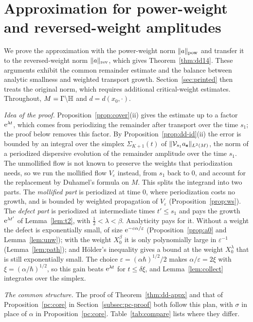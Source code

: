 \section{Approximation for power-weight and reversed-weight amplitudes}\label{sec:companion}

We prove the approximation with the power-weight norm $\lVert a\rVert_{\mathrm{pow}}$ and transfer it to the reversed-weight norm $\lVert a\rVert_{\mathrm{rev}}$, which gives Theorem~\ref{thm:dd14}. These arguments exhibit the common remainder estimate and the balance between analytic smallness and weighted transport growth. Section~\ref{sec:printed} then treats the original norm, which requires additional critical-weight estimates.
Throughout, $M=\Gamma\backslash\mathbb{H}$ and $d=d(x_0,\cdot)$.

\medskip\noindent\emph{Idea of the proof.}
Proposition~\ref{prop:cover}(ii) gives the estimate up to a factor $\mathrm{e}^{\lambda t}$, which comes from periodizing the remainder after
transport over the time $s_1$; the proof below removes this factor.
By Proposition~\ref{prop:dd-id}(ii) the error is bounded by an integral over the simplex $\Sigma_{K+1}(t)$ of
$\lVert \mathcal V_{s_1}a_{\mathbf s}\rVert_{L^2(M)}$, the norm of a periodized dispersive evolution of the remainder amplitude over the time
$s_1$. The unmollified flow is not known to preserve the weights that periodization needs, so we run the mollified flow
$V_\varepsilon$ instead, from $s_1$ back to $0$, and account for the replacement by Duhamel's formula on $M$. This splits the integrand
into two parts. The \emph{mollified part} is periodized at time $0$, where periodization costs no growth, and is bounded by weighted
propagation of $V_\varepsilon$ (Proposition~\ref{prop:ws}). The \emph{defect part} is periodized at intermediate times $t'\le s_1$ and pays
the growth $\mathrm{e}^{\lambda t'}$ of Lemma~\ref{lem:t2}, with $\tfrac12<\lambda<\beta$. Analyticity pays for it. Without a weight the
defect is exponentially small, of size $\mathrm{e}^{-c\alpha/\varepsilon}$ (Proposition~\ref{prop:a0} and Lemma~\ref{lem:unw}); with the
weight $X_0^\beta$ it is only polynomially large in $\varepsilon^{-1}$ (Lemma~\ref{lem:path}); and H\"older's inequality gives a bound
at the weight $X_0^\lambda$ that is still exponentially small. The choice $\varepsilon=(\alpha\hbar)^{1/2}/2$ makes $\alpha/\varepsilon=2\xi$
with $\xi=(\alpha/\hbar)^{1/2}$, so this gain beats $\mathrm{e}^{\lambda t}$ for $t\le\delta\xi$, and Lemma~\ref{lem:collect} integrates over
the simplex.

\medskip\noindent\emph{The common structure.}
The proof of Theorem~\ref{thm:dd-appx} and that of Proposition~\ref{pc:core} in Section~\ref{subsec:pc-proof} both follow this
plan, with $\sigma$ in place of $\alpha$ in Proposition~\ref{pc:core}. Table~\ref{tab:compare} lists where they differ.

